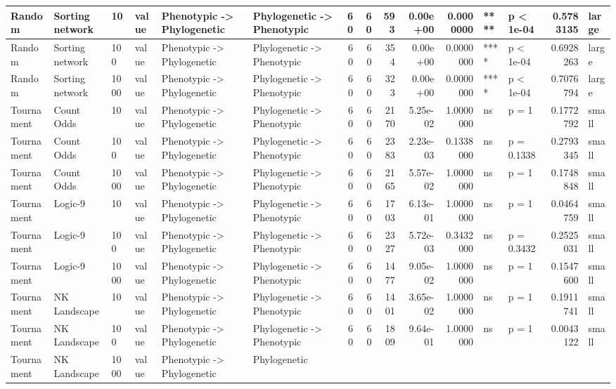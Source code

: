 \documentclass[]{book}
\begin{document}
\begin{table}
\begin{tabular}[t]{l|l|l|l|l|l|r|r|r|r|r|l|l|r|l}
\hline
Random & Sorting network & 10 & value & Phenotypic
    ->
Phylogenetic & Phylogenetic
    ->
Phenotypic & 60 & 60 & 593 & 0.00e+00 & 0.0000000 & **** & p < 1e-04 & 0.5783135 & large\\
\hline
Random & Sorting network & 100 & value & Phenotypic
    ->
Phylogenetic & Phylogenetic
    ->
Phenotypic & 60 & 60 & 354 & 0.00e+00 & 0.0000000 & **** & p < 1e-04 & 0.6928263 & large\\
\hline
Random & Sorting network & 1000 & value & Phenotypic
    ->
Phylogenetic & Phylogenetic
    ->
Phenotypic & 60 & 60 & 323 & 0.00e+00 & 0.0000000 & **** & p < 1e-04 & 0.7076794 & large\\
\hline
Tournament & Count Odds & 10 & value & Phenotypic
    ->
Phylogenetic & Phylogenetic
    ->
Phenotypic & 60 & 60 & 2170 & 5.25e-02 & 1.0000000 & ns & p = 1 & 0.1772792 & small\\
\hline
Tournament & Count Odds & 100 & value & Phenotypic
    ->
Phylogenetic & Phylogenetic
    ->
Phenotypic & 60 & 60 & 2383 & 2.23e-03 & 0.1338000 & ns & p = 0.1338 & 0.2793345 & small\\
\hline
Tournament & Count Odds & 1000 & value & Phenotypic
    ->
Phylogenetic & Phylogenetic
    ->
Phenotypic & 60 & 60 & 2165 & 5.57e-02 & 1.0000000 & ns & p = 1 & 0.1748848 & small\\
\hline
Tournament & Logic-9 & 10 & value & Phenotypic
    ->
Phylogenetic & Phylogenetic
    ->
Phenotypic & 60 & 60 & 1703 & 6.13e-01 & 1.0000000 & ns & p = 1 & 0.0464759 & small\\
\hline
Tournament & Logic-9 & 100 & value & Phenotypic
    ->
Phylogenetic & Phylogenetic
    ->
Phenotypic & 60 & 60 & 2327 & 5.72e-03 & 0.3432000 & ns & p = 0.3432 & 0.2525031 & small\\
\hline
Tournament & Logic-9 & 1000 & value & Phenotypic
    ->
Phylogenetic & Phylogenetic
    ->
Phenotypic & 60 & 60 & 1477 & 9.05e-02 & 1.0000000 & ns & p = 1 & 0.1547600 & small\\
\hline
Tournament & NK Landscape & 10 & value & Phenotypic
    ->
Phylogenetic & Phylogenetic
    ->
Phenotypic & 60 & 60 & 1401 & 3.65e-02 & 1.0000000 & ns & p = 1 & 0.1911741 & small\\
\hline
Tournament & NK Landscape & 100 & value & Phenotypic
    ->
Phylogenetic & Phylogenetic
    ->
Phenotypic & 60 & 60 & 1809 & 9.64e-01 & 1.0000000 & ns & p = 1 & 0.0043122 & small\\
\hline
Tournament & NK Landscape & 1000 & value & Phenotypic
    ->
Phylogenetic & Phylogenetic

\end{tabular}
\end{table}
\end{document}
